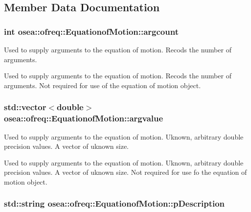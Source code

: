 \subsection{Member Data Documentation}
\hypertarget{classosea_1_1ofreq_1_1_equationof_motion_a13a15811fd575ac0fccf0d463218657b}{
\subsubsection[{argcount}]{\setlength{\rightskip}{0pt plus 5cm}int osea\-::ofreq\-::\-Equationof\-Motion\-::argcount\hspace{0.3cm}{\ttfamily [protected]}}}\label{classosea_1_1ofreq_1_1_equationof_motion_a13a15811fd575ac0fccf0d463218657b}


Used to supply arguments to the equation of motion. Recods the number of arguments. 

Used to supply arguments to the equation of motion. Recods the number of arguments. Not required for use of the equation of motion object. \hypertarget{classosea_1_1ofreq_1_1_equationof_motion_a1a9bf7f3460368c102aa8d4edec9b500}{
\subsubsection[{argvalue}]{\setlength{\rightskip}{0pt plus 5cm}std\-::vector$<$double$>$ osea\-::ofreq\-::\-Equationof\-Motion\-::argvalue\hspace{0.3cm}{\ttfamily [protected]}}}\label{classosea_1_1ofreq_1_1_equationof_motion_a1a9bf7f3460368c102aa8d4edec9b500}


Used to supply arguments to the equation of motion. Uknown, arbitrary double precision values. A vector of uknown size. 

Used to supply arguments to the equation of motion. Uknown, arbitrary double precision values. A vector of uknown size. Not required for use fo the equation of motion object. \hypertarget{classosea_1_1ofreq_1_1_equationof_motion_aa6ce10dacd47441d445a9170bd355792}{
\subsubsection[{p\-Description}]{\setlength{\rightskip}{0pt plus 5cm}std\-::string osea\-::ofreq\-::\-Equationof\-Motion\-::p\-Description\hspace{0.3cm}{\ttfamily [protected]}}}\label{classosea_1_1ofreq_1_1_equationof_motion_aa6ce10dacd47441d445a9170bd355792}



